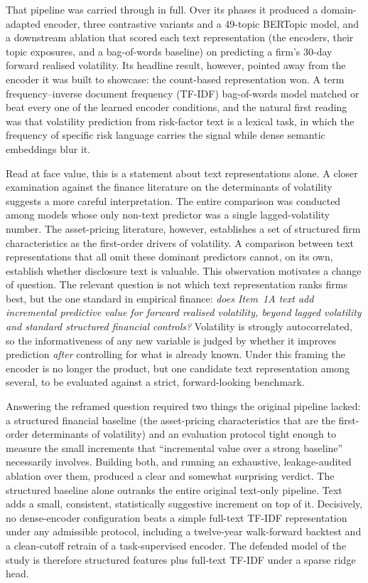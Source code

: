 \documentclass[logo,msc,ai]{infthesis}        %
\begin{document}
That pipeline was carried through in full. Over its phases it produced a domain-adapted encoder, three contrastive variants and a 49-topic BERTopic model, and a downstream ablation that scored each text representation (the encoders, their topic exposures, and a bag-of-words baseline) on predicting a firm's 30-day forward realised volatility. Its headline result, however, pointed away from the encoder it was built to showcase: the count-based representation won. A term frequency--inverse document frequency (TF-IDF) bag-of-words model matched or beat every one of the learned encoder conditions, and the natural first reading was that volatility prediction from risk-factor text is a lexical task, in which the frequency of specific risk language carries the signal while dense semantic embeddings blur it.

Read at face value, this is a statement about text representations alone. A closer examination against the finance literature on the determinants of volatility suggests a more careful interpretation. The entire comparison was conducted among models whose only non-text predictor was a single lagged-volatility number. The asset-pricing literature, however, establishes a set of structured firm characteristics as the first-order drivers of volatility. A comparison between text representations that all omit these dominant predictors cannot, on its own, establish whether disclosure text is valuable. This observation motivates a change of question. The relevant question is not which text representation ranks firms best, but the one standard in empirical finance: \emph{does Item~1A text add incremental predictive value for forward realised volatility, beyond lagged volatility and standard structured financial controls?} Volatility is strongly autocorrelated, so the informativeness of any new variable is judged by whether it improves prediction \emph{after} controlling for what is already known. Under this framing the encoder is no longer the product, but one candidate text representation among several, to be evaluated against a strict, forward-looking benchmark.

Answering the reframed question required two things the original pipeline lacked: a structured financial baseline (the asset-pricing characteristics that are the first-order determinants of volatility) and an evaluation protocol tight enough to measure the small increments that ``incremental value over a strong baseline'' necessarily involves. Building both, and running an exhaustive, leakage-audited ablation over them, produced a clear and somewhat surprising verdict. The structured baseline alone outranks the entire original text-only pipeline. Text adds a small, consistent, statistically suggestive increment on top of it. Decisively, no dense-encoder configuration beats a simple full-text TF-IDF representation under any admissible protocol, including a twelve-year walk-forward backtest and a clean-cutoff retrain of a task-supervised encoder. The defended model of the study is therefore structured features plus full-text TF-IDF under a sparse ridge head.
\end{document}
